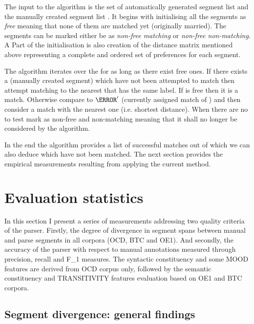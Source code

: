 The input to the algorithm is the set of automatically generated segment list \aslist and the manually created segment list \mslist.  It begins with initialising all the segments as \textit{free} meaning that none of them are matched yet (originally married). The segments can be marked either be as \textit{non-free matching} or \textit{non-free non-matching}. A Part of the initialisation is also creation of the distance matrix mentioned above representing a complete and ordered set of preferences for each segment. 

The algorithm iterates over the \aslist for as long as there exist free ones. If there exists a \ms (manually created segment) which have not been attempted to match \as then attempt matching \as to the nearest \ms that has the same label. If \ms is free then it is a match. Otherwise compare \as to $\as'$ (currently assigned match of \ms) and then consider a match with the nearest one (i.e. shortest distance). When there are no \mslist to test mark \as as non-free and non-matching meaning that it shall no longer be considered by the algorithm.

In the end the algorithm provides a list of successful matches out of which we can also deduce which \aslist \mslist have not been matched. The next section provides the empirical measurements resulting from applying the current method. 

\section{Evaluation statistics}
\label{sec:results}

In this section I present a series of measurements addressing two quality criteria of the parser. Firstly, the degree of divergence in segment spans between manual and parse segments in all corpora (OCD, BTC and OE1). And secondly, the accuracy of the parser with respect to manual annotations measured through precision, recall and F_1 measures. The syntactic constituency and some MOOD features are derived from OCD corpus only, followed by the semantic constituency and TRANSITIVITY features evaluation based on OE1 and BTC corpora. 

\subsection{Segment divergence: general findings}

